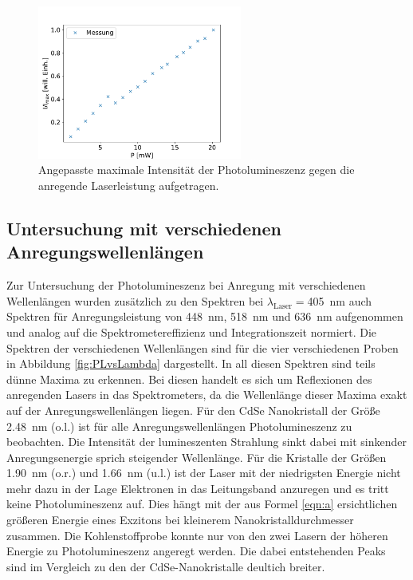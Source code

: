         \FloatBarrier

        \begin{figure}[h]
        \centering
        \includegraphics[width = 0.6\textwidth]{I_P.pdf}
        \caption{Angepasste maximale Intensität der Photolumineszenz gegen die anregende Laserleistung aufgetragen.}
        \label{fig:IvsP}
        \end{figure}

        \FloatBarrier


\subsection{Untersuchung mit verschiedenen Anregungswellenlängen}
    Zur Untersuchung der Photolumineszenz bei Anregung mit verschiedenen Wellenlängen wurden zusätzlich zu den Spektren bei $\lambda_{\text{Laser}}=$\SI{405}{\nano\metre} auch Spektren für Anregungsleistung
    von \SI{448}{\nano\metre}, \SI{518}{\nano\metre} und \SI{636}{\nano\metre} aufgenommen und analog auf die Spektrometereffizienz und Integrationszeit normiert. Die Spektren der verschiedenen Wellenlängen 
    sind für die vier verschiedenen Proben in Abbildung \ref{fig:PLvsLambda} dargestellt. In all diesen Spektren sind teils dünne Maxima zu erkennen. Bei diesen handelt es sich um Reflexionen des anregenden
    Lasers in das Spektrometers, da die Wellenlänge dieser Maxima exakt auf der Anregungswellenlängen liegen.
    Für den CdSe Nanokristall der Größe \SI{2.48}{\nano\metre} (o.l.) ist für alle Anregungswellenlängen Photolumineszenz zu beobachten. Die Intensität der lumineszenten Strahlung sinkt dabei mit sinkender 
    Anregungsenergie sprich steigender Wellenlänge. Für die Kristalle der Größen \SI{1.90}{\nano\metre} (o.r.) und \SI{1.66}{\nano\metre} (u.l.) ist der Laser mit der niedrigsten Energie nicht mehr dazu in der Lage 
    Elektronen in das Leitungsband anzuregen und es tritt keine Photolumineszenz auf. Dies hängt mit der aus Formel \ref{eqn:a} ersichtlichen größeren Energie eines Exzitons bei kleinerem 
    Nanokristalldurchmesser zusammen. Die Kohlenstoffprobe konnte nur von den zwei Lasern der höheren Energie zu Photolumineszenz angeregt werden. Die dabei entstehenden Peaks sind im Vergleich zu den der 
    CdSe-Nanokristalle deultich breiter.


